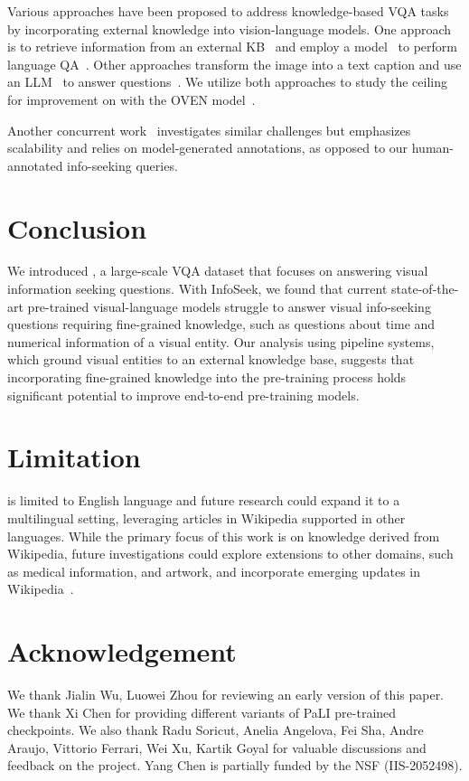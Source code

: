 \documentclass[11pt]{article}
\begin{document}
Various approaches have been proposed to address knowledge-based VQA tasks~\cite{marino2019ok} by incorporating external knowledge into vision-language models. One approach is to retrieve information from an external KB~\cite{marino2021krisp, hu2022reveal, wu2022entity} and employ a model~\cite{izacard2020fid} to perform language QA~\cite{gui2021kat, lin2022revive}. Other approaches transform the image into a text caption and use an LLM~\cite{brown2020language, chowdhery2022palm} to answer questions~\cite{yang2022pica, hu2022promptcap}.
We utilize both approaches to study the ceiling for improvement on \infoseek with the OVEN model~\cite{hu2023opendomain}.

Another concurrent work~\citep{mensink2023encyclopedic} investigates similar challenges but emphasizes scalability and relies on model-generated annotations, as opposed to our human-annotated info-seeking queries.

 
\section{Conclusion}
\label{sec:conclusion}
We introduced \infoseek, a large-scale VQA dataset that focuses on answering visual information seeking questions. 
With {\sc InfoSeek}, we found that current state-of-the-art pre-trained visual-language models struggle to answer visual info-seeking questions requiring fine-grained knowledge, such as questions about time and numerical information of a visual entity.
Our analysis using pipeline systems, which ground visual entities to an external knowledge base, suggests that incorporating fine-grained knowledge into the pre-training process holds significant potential to improve end-to-end pre-training models.  
\section{Limitation}
\label{sec:limitation}
\ourdataset is limited to English language and future research could expand it to a multilingual setting, leveraging articles in Wikipedia supported in other languages.
While the primary focus of this work is on knowledge derived from Wikipedia, future investigations could explore extensions to other domains, such as medical information, and artwork, and incorporate emerging updates in Wikipedia~\cite{iv-etal-2022-fruit}.
 
\section*{Acknowledgement}
We thank Jialin Wu, Luowei Zhou for reviewing an early version of this paper. We thank Xi Chen for providing different variants of PaLI pre-trained checkpoints. We also thank Radu Soricut, Anelia Angelova, Fei Sha, Andre Araujo, Vittorio Ferrari, Wei Xu, Kartik Goyal for valuable discussions and feedback on the project. Yang Chen is partially funded by the NSF (IIS-2052498).
\end{document}
